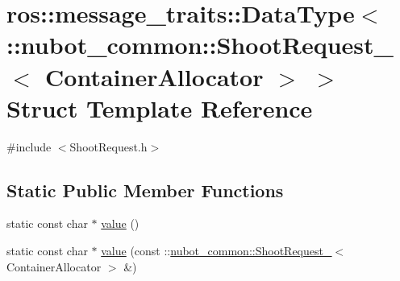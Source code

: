 \hypertarget{structros_1_1message__traits_1_1DataType_3_01_1_1nubot__common_1_1ShootRequest___3_01ContainerAllocator_01_4_01_4}{\section{ros\-:\-:message\-\_\-traits\-:\-:Data\-Type$<$ \-:\-:nubot\-\_\-common\-:\-:Shoot\-Request\-\_\-$<$ Container\-Allocator $>$ $>$ Struct Template Reference}
\label{structros_1_1message__traits_1_1DataType_3_01_1_1nubot__common_1_1ShootRequest___3_01ContainerAllocator_01_4_01_4}
}


{\ttfamily \#include $<$Shoot\-Request.\-h$>$}

\subsection*{Static Public Member Functions}
\begin{DoxyCompactItemize}
\item 
static const char $\ast$ \hyperlink{structros_1_1message__traits_1_1DataType_3_01_1_1nubot__common_1_1ShootRequest___3_01ContainerAllocator_01_4_01_4_a5a09acc0a461d3137a91792c1a1d305b}{value} ()
\item 
static const char $\ast$ \hyperlink{structros_1_1message__traits_1_1DataType_3_01_1_1nubot__common_1_1ShootRequest___3_01ContainerAllocator_01_4_01_4_ab8516dc542eb591eeaa8c64ff29faf2d}{value} (const \-::\hyperlink{structnubot__common_1_1ShootRequest__}{nubot\-\_\-common\-::\-Shoot\-Request\-\_\-}$<$ Container\-Allocator $>$ \&)
\end{DoxyCompactItemize}


